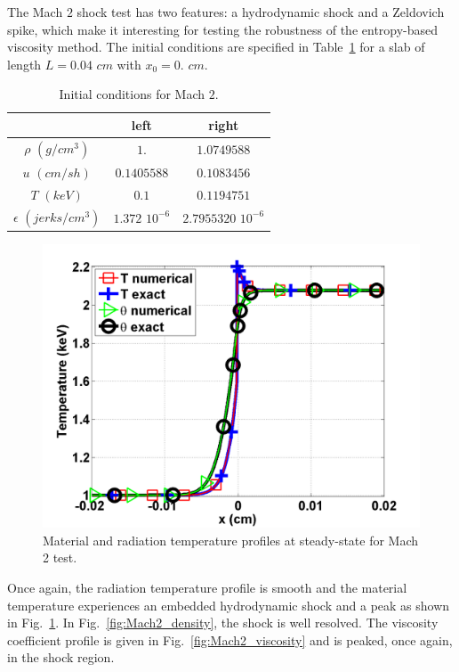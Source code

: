 \documentclass[review]{elsarticle}
\newcommand{\fig}[1]{Fig.~\ref{#1}}                      %
\newcommand{\tbl}[1]{Table~\ref{#1}}                     %
\begin{document}
The Mach $2$ shock test has two features: a hydrodynamic shock and a Zeldovich spike, which make it interesting for testing the robustness of the entropy-based viscosity method. The initial conditions are specified in \tbl{tbl:table5} for a slab of length $L=0.04$ $cm$ with $x_0 = 0.$ $cm$.
\begin{table}[H]
\caption{\label{tbl:table5} Initial conditions for Mach $2$.}
\begin{center}
\begin{tabular}{|c|c|c|}
\hline 
 & left  & right \\ \hline
$\rho$ $(g/cm^3)$ &$1.$ & $1.0749588$ \\ \hline
$u$ $(cm/sh)$& $0.1405588$ & $0.1083456$ \\ \hline
$T$ $(keV)$& $0.1$ & $0.1194751$\\ \hline
$\epsilon$ $(jerks/cm^3)$ & $1.372$ $10^{-6}$ & $2.7955320$ $10^{-6}$\\
\hline
\end{tabular}  
\end{center}  
\end{table}
\begin{figure}[H]
                \centering
                \includegraphics[width=\textwidth]{Mach_2_nel_2000_temperature.png}
        \caption{Material and radiation temperature profiles at steady-state for Mach 2 test.}\label{fig:Mach2_temp}
\end{figure}
Once again, the radiation temperature profile is smooth and the material temperature experiences an embedded hydrodynamic shock and a peak as shown in \fig{fig:Mach2_temp}. In \fig{fig:Mach2_density}, the shock is well resolved. The viscosity coefficient profile is given in \fig{fig:Mach2_viscosity} and is peaked, once again, in the shock region. 
\end{document}
